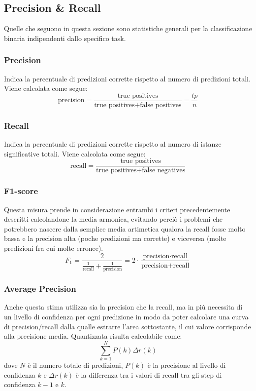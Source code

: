\subsection{Precision \& Recall}
Quelle che seguono in questa sezione sono statistiche generali per la classificazione binaria indipendenti dallo specifico task.

\subsubsection{Precision}
Indica la percentuale di predizioni corrette rispetto al numero di predizioni totali.
Viene calcolata come segue:
$$
\text{precision} = \frac{\text{true positives}}{\text{true positives} + \text{false positives}} = \frac{tp}{n}
$$

\subsubsection{Recall}
Indica la percentuale di predizioni corrette rispetto al numero di istanze significative totali.
Viene calcolata come segue:
$$
\text{recall} = \frac{\text{true positives}}{\text{true positives} + \text{false negatives}}
$$

\subsubsection{F1-score}
Questa misura prende in considerazione entrambi i criteri precedentemente descritti calcolandone la media armonica, evitando perciò i problemi che potrebbero nascere dalla semplice media artimetica qualora la recall fosse molto bassa e la precision alta (poche predizioni ma corrette) e viceversa (molte predizioni fra cui molte erronee).
$$
F_{1} =
		\frac{2}{\frac{1}{\text{recall}} + \frac{1}{\text{precision}}}
	  =
		2 \cdot \frac{\text{precision} \cdot {\text{recall}}}{\text{precision} + \text{recall}}
$$

\subsubsection{Average Precision}
Anche questa stima utilizza sia la precision che la recall, ma in più necessita di un livello di confidenza per ogni predizione in modo da poter calcolare una curva di precision/recall dalla qualle estrarre l'area sottostante, il cui valore corrisponde alla precisione media. Quantizzata risulta calcolabile come:
$$
\sum_{k=1}^{N}{P(k) \Delta r(k)}
$$
dove $N$ è il numero totale di predizioni, $P(k)$ è la precisione al livello di confidenza $k$ e $\Delta r(k)$ è la differenza tra i valori di recall tra gli step di confidenza $k-1$ e $k$.

